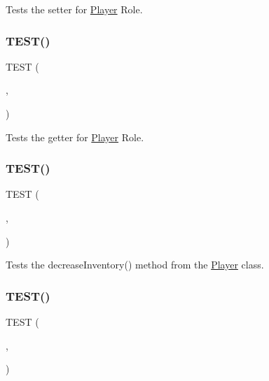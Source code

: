 Tests the setter for \hyperlink{classPlayer}{Player} Role. \mbox{\label{group__group1_ga16480984296f888db0a3754b1ef28ead}} 
\subsubsection{\texorpdfstring{T\+E\+S\+T()}{TEST()}\hspace{0.1cm}{\footnotesize\ttfamily [4/18]}}
{\footnotesize\ttfamily T\+E\+ST (\begin{DoxyParamCaption}\item[{player\+Test}]{,  }\item[{get\+Role\+Test}]{ }\end{DoxyParamCaption})}

Tests the getter for \hyperlink{classPlayer}{Player} Role. \mbox{\label{group__group1_gabd2115485a1c4d297b77ef378f7c49e5}} 
\subsubsection{\texorpdfstring{T\+E\+S\+T()}{TEST()}\hspace{0.1cm}{\footnotesize\ttfamily [5/18]}}
{\footnotesize\ttfamily T\+E\+ST (\begin{DoxyParamCaption}\item[{player\+Test}]{,  }\item[{decrease\+Inventory\+Test}]{ }\end{DoxyParamCaption})}

Tests the decrease\+Inventory() method from the \hyperlink{classPlayer}{Player} class. \mbox{\label{group__group1_ga21e07664ff2e1e5b18dc5157a7f69460}} 
\subsubsection{\texorpdfstring{T\+E\+S\+T()}{TEST()}\hspace{0.1cm}{\footnotesize\ttfamily [6/18]}}
{\footnotesize\ttfamily T\+E\+ST (\begin{DoxyParamCaption}\item[{player\+Test}]{,  }\item[{increase\+Inventory\+Test}]{ }\end{DoxyParamCaption})}

